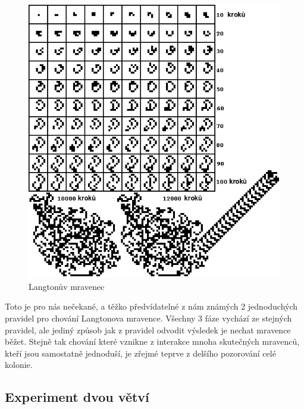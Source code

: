\documentclass[12pt]{article}
\begin{document}
\begin{figure}[hbtp]
  \caption{Langtonův mravenec}
  \label{fig:langtonant}
  \begin{center}
  	\includegraphics[scale=0.5]{AMEIHUND_Langtons_Ameise_svensk}
  \end{center}
\end{figure}

Toto je pro nás nečekané, a těžko předvídatelné z nám známých 2 jednoduchých pravidel pro chování Langtonova mravence. Všechny 3 fáze vychází ze stejných pravidel, ale jediný způsob jak z pravidel  odvodit výsledek  je nechat mravence běžet. Stejně tak chování které vznikne z interakce mnoha skutečných mravenců, kteří jsou samostatně jednoduší, je zřejmé teprve z delšího pozorování celé kolonie.\cite{prattchet2002}

\subsection{Experiment dvou větví}
\end{document}
